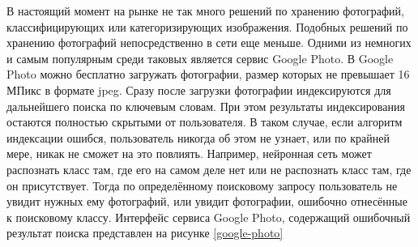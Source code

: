 В настоящий момент на рынке не так много решений по хранению фотографий, классифицирующих или категоризирующих изображения.
Подобных решений по хранению фотографий непосредственно в сети еще меньше.
Одними из немногих и самым популярным среди таковых является сервис Google Photo. 
В Google Photo можно бесплатно загружать фотографии, размер которых не превышает 16 МПикс в формате jpeg. 
Сразу после загрузки фотографии индексируются для дальнейшего поиска по ключевым словам.
При этом результаты индексирования остаются полностью скрытыми от пользователя. 
В таком случае, если алгоритм индексации ошибся, пользователь никогда об этом не узнает, или по крайней мере, никак не сможет на это повлиять. 
Например, нейронная сеть может распознать класс там, где его на самом деле нет или не распознать класс там, где он присутствует.
Тогда по определённому поисковому запросу пользователь не увидит нужных ему фотографий, или увидит фотографии, ошибочно отнесённые к поисковому классу.
Интерфейс сервиса Google Photo, содержащий ошибочный результат поиска представлен на рисунке \ref{google-photo}


